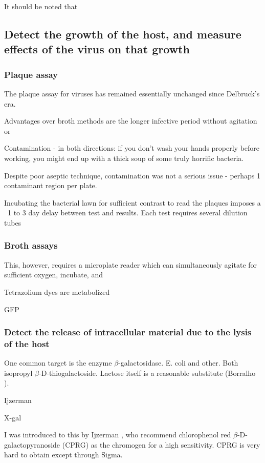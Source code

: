 \documentclass[paper.tex]{subfiles}
\begin{document}
It should be noted that 

\subsection{Detect the growth of the host, and measure effects of the virus on that growth}

\subsubsection{Plaque assay}

The plaque assay for viruses has remained essentially unchanged since Delbruck's era.

Advantages over broth methods are the longer infective period without agitation or 

Contamination - in both directions: if you don’t wash your hands properly before working, you might end up with a thick soup of some truly horrific bacteria.

Despite poor aseptic technique, contamination was not a serious issue - perhaps 1 contaminant region per plate.

Incubating the bacterial lawn for sufficient contrast to read the plaques imposes a ~1 to 3 day delay between test and results. Each test requires several dilution tubes



\subsubsection{Broth assays}

This, however, requires a microplate reader which can simultaneously agitate for sufficient oxygen, incubate, and 

Tetrazolium dyes are metabolized 

GFP

\subsubsection{Detect the release of intracellular material due to the lysis of the host}

One common target is the enzyme $\beta$-galactosidase. E. coli and other. Both  isopropyl $\beta$-D-thiogalactoside. Lactose itself is a reasonable substitute (Borralho \cite{Lactose2002}).

Ijzerman

X-gal \cite{Improved}

I was introduced to this by Ijzerman \cite{liquid1993}, who recommend chlorophenol red $\beta$-D-galactopyranoside (CPRG) as the chromogen for a high sensitivity. CPRG is very hard to obtain except through Sigma.
\end{document}
